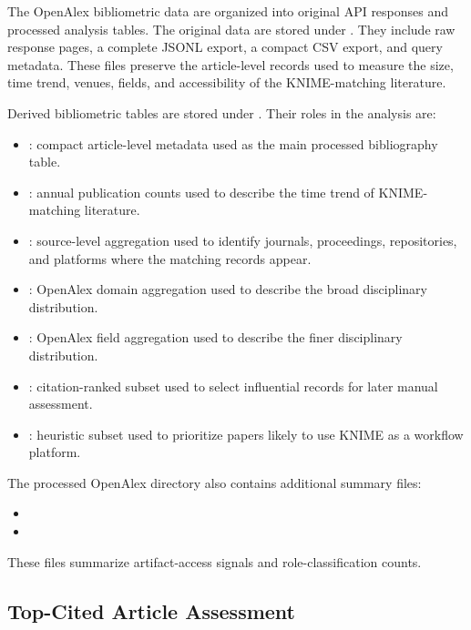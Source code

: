\documentclass[runningheads]{llncs}
\begin{document}
The OpenAlex bibliometric data are organized into original API responses and
processed analysis tables. The original data are stored under
.
They include raw response pages, a complete JSONL export, a compact CSV export,
and query metadata. These files preserve the article-level records used to
measure the size, time trend, venues, fields, and accessibility of the
KNIME-matching literature.

Derived bibliometric tables are stored under
.
Their roles in the analysis are:

\begin{itemize}
\item {}: compact article-level
metadata used as the main processed bibliography table.
\item {}: annual publication
counts used to describe the time trend of KNIME-matching literature.
\item {}: source-level aggregation
used to identify journals, proceedings, repositories, and platforms where the
matching records appear.
\item {}: OpenAlex domain
aggregation used to describe the broad disciplinary distribution.
\item {}: OpenAlex field
aggregation used to describe the finer disciplinary distribution.
\item {}: citation-ranked subset
used to select influential records for later manual assessment.
\item {}: heuristic
subset used to prioritize papers likely to use KNIME as a workflow platform.
\end{itemize}

The processed OpenAlex directory also contains additional summary files:
\begin{itemize}
\item {}
\item {}
\end{itemize}
These files summarize artifact-access signals and role-classification counts.

\subsection{Top-Cited Article Assessment}
\end{document}
